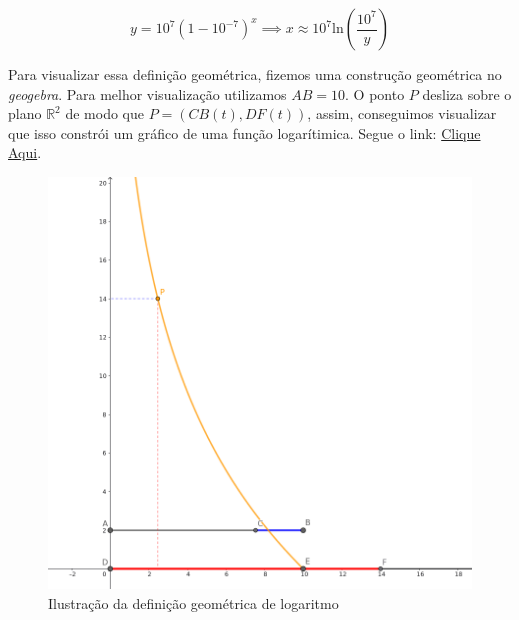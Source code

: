 \[
y = 10^7 (1-10^{-7})^{x} \implies x \approx 10^7 \text{ln}\left(\frac{10^7}{y}\right)
\]

Para visualizar essa definição geométrica, fizemos uma construção geométrica no \textit{geogebra}. Para melhor visualização utilizamos $AB = 10$. O ponto $P$ desliza sobre o plano $\mathbb{R}^2$ de modo que $P = (CB(t), DF(t))$, assim, conseguimos visualizar que isso constrói um gráfico de uma função logarítimica. Segue o link: 
\href{https://www.geogebra.org/classic/hjcec98z}{Clique Aqui}.

\begin{figure}[h!]
    \centering
    \includegraphics[width=0.9\linewidth]{img/defgeogebra.png}
    \caption{Ilustração da definição geométrica de logaritmo}
\end{figure}

